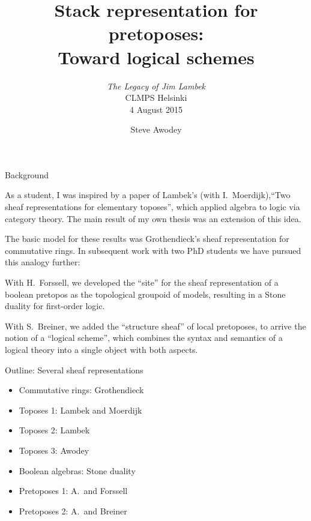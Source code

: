 \documentclass{beamer}
\begin{document}

\title{
{\sc Stack representation for pretoposes:\\
  Toward logical schemes}
}
\author{
\emph{The Legacy of Jim Lambek}\\
CLMPS Helsinki\\
4 August 2015
}
\date{
Steve Awodey}

\maketitle

\begin{frame}{Background}

As a student, I was inspired by a paper of Lambek's (with I.~Moerdijk),``Two sheaf representations for elementary toposes'', 
which applied algebra to logic via category theory. The main result of my own thesis was an extension of this idea. 
\medskip

The basic model for these results was Grothendieck's sheaf representation for commutative
rings. In subsequent work with two PhD students we have pursued this analogy further: 
\medskip

With H.~Forssell, we developed the ``site'' for the sheaf representation of a boolean pretopos as the topological groupoid of models,
resulting in a Stone duality for first-order logic. 
\medskip

With S.~Breiner, we added the ``structure sheaf'' of local pretoposes, to arrive the notion of a ``logical scheme'', which combines the syntax
and semantics of a logical theory into a single object with both aspects. 

\end{frame}
\begin{frame}{Outline: Several sheaf representations}


\begin{itemize}

\item Commutative rings: Grothendieck

\item Toposes 1: Lambek and Moerdijk

\item Toposes 2: Lambek

\item Toposes 3: Awodey

\item Boolean algebras: Stone duality

\item Pretoposes 1: A.\ and Forssell

\item Pretoposes 2: A.\ and Breiner

\end{itemize}

\end{frame}
\end{document}
